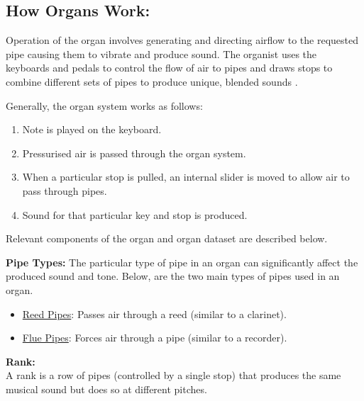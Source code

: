 \noindent \subsection{How Organs Work:}
\hspace{0.5cm} Operation of the organ involves generating and directing airflow to the requested pipe causing them to vibrate and produce sound. The organist uses the keyboards and pedals to control the flow of air to pipes and draws stops to combine different sets of pipes to produce unique, blended sounds \cite{organvideo}.

\noindent Generally, the organ system works as follows:
\vspace{-0.15cm}
\begin{enumerate}
    \itemsep0em 
\item Note is played on the keyboard.
\vspace{-0.1cm}
\item Pressurised air is passed through the organ system.
\vspace{-0.1cm}
\item When a particular stop is pulled, an internal slider is moved to allow air to pass through pipes.
\vspace{-0.1cm}
\item Sound for that particular key and stop is produced.
\end{enumerate}
\vspace{-0.1cm}

\noindent Relevant components of the organ and organ dataset are described below. 

\noindent \textbf{Pipe Types:}
The particular type of pipe in an organ can significantly affect the produced sound and tone. Below, are the two main types of pipes used in an organ. 
\vspace{-0.15cm}
\begin{itemize}
    \itemsep0em 
\item \underline{Reed Pipes}: Passes air through a reed (similar to a clarinet).
\item \underline{Flue Pipes}: Forces air through a pipe (similar to a recorder).
\end{itemize}
\vspace{-0.2cm}
\cite{organvideo}

\noindent \textbf{Rank:}
\\ \hspace*{0.5cm} A rank is a row of pipes (controlled by a single stop) that produces the same musical sound but does so at different pitches. 

